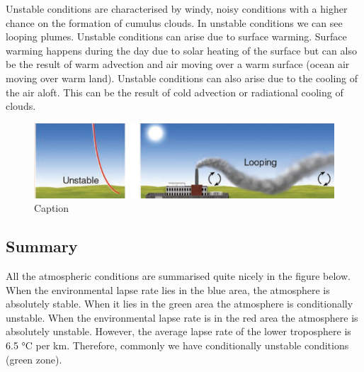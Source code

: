 \documentclass[12pt,oneside]{book}
\begin{document}
Unstable conditions are characterised by windy, noisy conditions with a
higher chance on the formation of cumulus clouds. In unstable conditions
we can see looping plumes. Unstable conditions can arise due to surface
warming. Surface warming happens during the day due to solar heating of
the surface but can also be the result of warm advection and air moving
over a warm surface (ocean air moving over warm land). Unstable
conditions can also arise due to the cooling of the air aloft. This can
be the result of cold advection or radiational cooling of clouds.

\begin{figure}

{\centering \includegraphics[width=1\linewidth]{figures/Figure311} 

}

\caption{Caption}\label{fig:Looping}
\end{figure}

\subsection{Summary}\label{summary-1}

All the atmospheric conditions are summarised quite nicely in the figure
below. When the environmental lapse rate lies in the blue area, the
atmosphere is absolutely stable. When it lies in the green area the
atmosphere is conditionally unstable. When the environmental lapse rate
is in the red area the atmosphere is absolutely unstable. However, the
average lapse rate of the lower troposphere is 6.5 °C per km. Therefore,
commonly we have conditionally unstable conditions (green zone).
\end{document}
